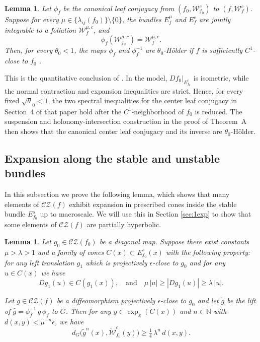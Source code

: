 \documentclass[11pt]{amsart}
\numberwithin{equation}{section}
\newcommand{\N}{\mathbb{N}}
\newcommand{\CZ}{\mathcal{CZ}}
\theoremstyle{plain}
\newtheorem{lem}[thm]{Lemma}
\begin{document}
\begin{lem}\label{lem:holexp1}
Let  $\phi_f$ be the  canonical leaf conjugacy from
$(f_0,\mathcal W^c_{f_0})$ to $(f,\mathcal W^c_f)$. Suppose for every
$\mu\in\{\lambda_{ij}(f_0)\}\setminus\{0\}$, the bundles $E^\mu_f$ and
$E^c_f$ are jointly integrable to a foliation $\mathcal W^{\mu,c}_f$,
and
 \[
\phi_f(\mathcal W^{\mu,c}_{f_0})=\mathcal W^{\mu,c}_f.
\]
Then, for  every $\theta_0<1$,  the maps $\phi_f$ and $\phi_f^{-1}$ are
$\theta_0$-H\"older if $f$ is sufficiently  $C^1$-close to $f_0$ .
\end{lem}

This is the quantitative conclusion of
\cite[Theorem~A and Sections~4 and~9]{PSWholrev}.  In the model,
$Df_0|_{E^c_{f_0}}$ is isometric, while the normal contraction and
expansion inequalities are strict.  Hence, for every fixed
$\sqrt\theta_0<1$, the two spectral inequalities for the center leaf
conjugacy in Section~4 of that paper hold after the $C^1$-neighborhood
of $f_0$ is reduced.  The suspension and holonomy-intersection
construction in the proof of Theorem~A then shows that the canonical center
leaf conjugacy and its inverse are $\theta_0$-H\"older.





\subsection{Expansion along the stable and unstable bundles}

In this subsection we prove the following lemma, which shows that many elements of
$\CZ(f)$ exhibit expansion in prescribed cones inside the stable bundle
$E^s_{f_0}$ up to macroscale. We will use this in Section \ref{sec:1exp} to show that some
elements of $\CZ(f)$ are partially hyperbolic.


\begin{lem}\label{lem:coneexpan}
Let $g_0\in\CZ(f_0)$ be a diagonal map.
Suppose there exist constants $\mu>\lambda>1$ and a family of cones
$C(x)\subset E^s_{f_0}(x)$ with the following property: for any left
translation $g_1$ which is projectively $\epsilon$-close to $g_0$ and for any
$u\in C(x)$ we have  
\[Dg_1(u)\in C(g_1(x)),\quad\text{and}\quad
\mu\,|u|\ge |Dg_1(u)|\ge \lambda\,|u|.
\]

Let $g\in\CZ(f)$ be a diffeomorphism projectively $\epsilon$-close to $g_0$ and
let $\tilde g$ be the lift of  $\hat g=\phi_f^{-1}\,g\,\phi_f$ to $G$. Then for any $y\in\exp_x(C(x))$ and $n\in \N$ with
$d(x,y)<\mu^{-n}\epsilon$, we have
\[
d_G\big(\tilde g^n(x),\widetilde{\mathcal W}^c_{f_0}(y)\big)
\ge \tfrac{1}{4}\,\lambda^{n}\, d(x,y).
\]
\end{lem}
\end{document}
